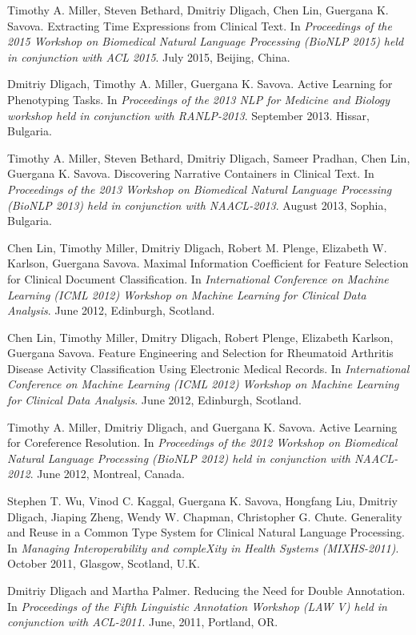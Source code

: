 \documentclass[letterpaper]{article}
\renewenvironment{itemize}{
  \begin{list}{}{
    \setlength{\leftmargin}{1.5em}
  }
}{
  \end{list}
}
\begin{document}
\begin{itemize}
\item Timothy A. Miller, Steven Bethard, Dmitriy Dligach, Chen Lin, Guergana K. Savova. Extracting Time Expressions from Clinical Text. In \emph{Proceedings of the 2015 Workshop on Biomedical Natural Language Processing (BioNLP 2015) held in conjunction with ACL 2015}. July 2015, Beijing, China.
\item Dmitriy Dligach, Timothy A. Miller, Guergana K. Savova. Active Learning for Phenotyping Tasks. In \emph{Proceedings of the 2013 NLP for Medicine and Biology workshop held in conjunction with RANLP-2013}. September 2013. Hissar, Bulgaria.
\item Timothy A. Miller, Steven Bethard, Dmitriy Dligach, Sameer Pradhan, Chen Lin, Guergana K. Savova. Discovering Narrative Containers in Clinical Text. In \emph{Proceedings of the 2013 Workshop on Biomedical Natural Language Processing (BioNLP 2013) held in conjunction with NAACL-2013}. August 2013, Sophia, Bulgaria.
\item Chen Lin, Timothy Miller, Dmitriy Dligach, Robert M. Plenge, Elizabeth W. Karlson, Guergana Savova. Maximal Information Coefficient for Feature Selection for Clinical Document Classification. In \emph{International Conference on Machine Learning (ICML 2012) Workshop on Machine Learning for Clinical Data Analysis}. June 2012, Edinburgh, Scotland.
\item Chen Lin, Timothy Miller, Dmitry Dligach, Robert Plenge, Elizabeth Karlson, Guergana Savova. Feature Engineering and Selection for Rheumatoid Arthritis Disease Activity Classification Using Electronic Medical Records. In \emph{International Conference on Machine Learning (ICML 2012) Workshop on Machine Learning for Clinical Data Analysis}. June 2012, Edinburgh, Scotland.
\item Timothy A. Miller, Dmitriy Dligach, and Guergana K. Savova. Active Learning for Coreference Resolution. In \emph{Proceedings of the 2012 Workshop on Biomedical Natural Language Processing (BioNLP 2012) held in conjunction with NAACL-2012}. June 2012, Montreal, Canada.
\item Stephen T. Wu, Vinod C. Kaggal, Guergana K. Savova, Hongfang Liu, Dmitriy Dligach, Jiaping Zheng, Wendy W. Chapman, Christopher G. Chute. Generality and Reuse in a Common Type System for Clinical Natural Language Processing. In \emph{Managing Interoperability and compleXity in Health Systems (MIXHS-2011)}. October 2011, Glasgow, Scotland, U.K.
\item Dmitriy Dligach and Martha Palmer. Reducing the Need for Double Annotation. In \emph{Proceedings of the Fifth Linguistic Annotation Workshop (LAW V) held in conjunction with ACL-2011}. June, 2011, Portland, OR.

\end{itemize}
\end{document}
